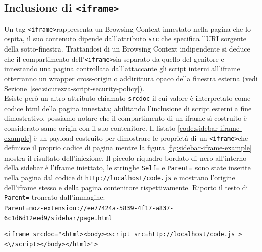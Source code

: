\documentclass{sapthesis}
\newcommand{\code}[1]{\texttt{#1}}
\newcommand{\file}[1]{\code{#1}}
\newcommand{\refSection}[1]{Sezione~\ref{#1}}
\newcommand{\tagHTML}[1]{\code{<#1>}}
\newcommand{\iframe}{\tagHTML{iframe}}
\begin{document}
        
        \subsection{Inclusione di \iframe}
        \label{sec:attaccando-vuln-bypass-iframe}
            Un tag \iframe rappresenta un Browsing Context
            innestato nella pagina che lo ospita, il suo contenuto dipende dall'attributo \code{src} che specifica
            l'URI sorgente della sotto-finestra. Trattandosi di un Browsing Context indipendente si deduce che
            il compartimento dell'\iframe sia separato da quello del genitore e innestando una pagina controllata
            dall'attaccante gli script interni all'iframe otterranno un wrapper cross-origin o addirittura opaco
            della finestra esterna (vedi \refSection{sec:sicurezza-script-security-policy}).\\
            Esiste però un altro attributo chiamato \code{srcdoc} il cui valore è interpretato come codice html della
            pagina innestata; abilitando l'inclusione di script esterni a fine dimostrativo, possiamo notare che
            il compartimento di un iframe sì costruito è considerato same-origin con il suo contenitore.
            Il listato \ref{code:sidebar-iframe-example} è un payload costruito per dimostrare le proprietà di un
            \iframe che definisce il proprio codice di pagina mentre la figura \ref{fig:sidebar-iframe-example}
            mostra il risultato dell'iniezione. Il piccolo riquadro bordato di nero all'interno della sidebar è
            l'iframe iniettato, le stringhe \code{Self=} e \code{Parent=} sono state inserite nella pagina dal
            codice di \file{http://localhost/code.js} e mostrano l'origine dell'iframe stesso e della pagina
            contenitore rispettivamente. Riporto il testo di \code{Parent=} troncato dall'immagine:\\
            \code{Parent=moz-extension://ee77424a-5839-4f17-a837-6c1d6d12eed9/sidebar/page.html}\\

            \begin{lstlisting}[caption={iframe costruito con srcdoc},label={code:sidebar-iframe-example}]
<iframe srcdoc="<html><body><script src=http://localhost/code.js ><\/script></body></html>">
            \end{lstlisting}
\end{document}
